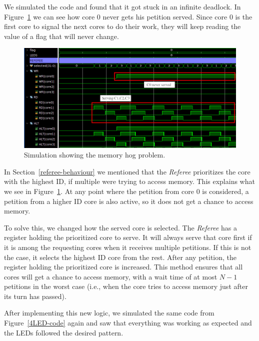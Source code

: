 We simulated the code and found that it got stuck in an infinite deadlock.
In Figure~\ref{4LED-sim-bad} we can see how core 0 never gets his petition served.
Since core 0 is the first core to signal the next cores to do their work, they will keep reading the value of a flag that will never change.

\begin{figure}[h!]
    \centering
    \includegraphics[width=1.0\textwidth]{images/flag4_sim_bad_crop_arrow.png}
    \caption{Simulation showing the memory hog problem.}
    \label{4LED-sim-bad}
\end{figure}

In Section~\ref{referee-behaviour} we mentioned that the \textit{Referee} prioritizes the core with the highest ID, if multiple were trying to access memory.
This explains what we see in Figure~\ref{4LED-sim-bad}.
At any point where the petition from core 0 is considered, a petition from a higher ID core is also active, so it does not get a chance to access memory.

To solve this, we changed how the served core is selected.
The \textit{Referee} has a register holding the prioritized core to serve.
It will always serve that core first if it is among the requesting cores when it receives multiple petitions.
If this is not the case, it selects the highest ID core from the rest.
After any petition, the register holding the prioritized core is increased.
This method ensures that all cores will get a chance to access memory, with a wait time of at most $N-1$ petitions in the worst case (i.e., when the core tries to access memory just after its turn has passed).


After implementing this new logic, we simulated the same code from Figure~\ref{4LED-code} again and saw that everything was working as expected and the LEDs followed the desired pattern.

